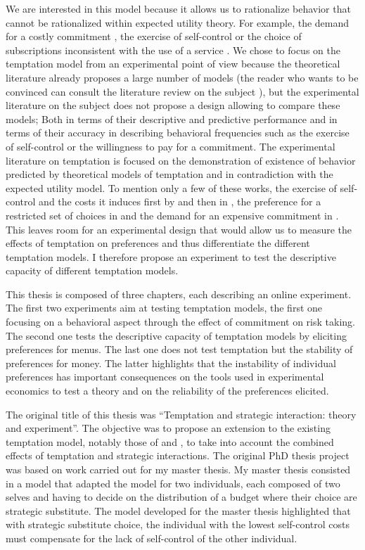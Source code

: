 \documentclass[
]{book}
\begin{document}
We are interested in this model because it allows us to rationalize behavior
that cannot be rationalized within expected utility theory.
For example, the demand for a costly commitment \citep{bryan2010commitment, ashraf2006tying}, the exercise of self-control \citep{dellavigna2004contract} or the choice of subscriptions inconsistent with the use of a service \citep{dellavigna2006paying}.
We chose to focus on the temptation model from an experimental point of view
because the theoretical literature already proposes a large number of models
(the reader who wants to be convinced can consult the literature review on the subject \citet{lipman2013temptation}), but the experimental literature on the subject does not propose a design allowing to compare these models;
Both in terms of their descriptive and predictive performance and in terms of their accuracy in describing behavioral frequencies such as the exercise of self-control or the willingness to pay for a commitment.
The experimental literature on temptation is focused on the demonstration of existence of
behavior predicted by theoretical models of temptation and in contradiction with
the expected utility model.
To mention only a few of these works, the exercise of self-control and the costs
it induces first by \citet{mischel1989delay} and then in \citet{kuhn2014self}, the preference for a
restricted set of choices in \citet{toussaert2018eliciting} and the demand for an expensive
commitment in \citet{houser2018temptation}.
This leaves room for an experimental design that would allow us to measure the
effects of temptation on preferences and thus differentiate the different
temptation models.
I therefore propose an experiment to test the descriptive capacity of different
temptation models.

This thesis is composed of three chapters, each describing an online experiment.
The first two experiments aim at testing temptation models, the first one
focusing on a behavioral aspect through the effect of commitment on risk taking.
The second one tests the descriptive capacity of temptation models by eliciting
preferences for menus.
The last one does not test temptation but the stability of preferences for money.
The latter highlights that the instability of individual preferences has
important consequences on the tools used in experimental economics to test a
theory and on the reliability of the preferences elicited.

The original title of this thesis was ``Temptation and strategic interaction:
theory and experiment''.
The objective was to propose an extension to the existing temptation model,
notably those of \citet{gul2001temptation} and \citet{fudenberg2006dual}, to take into account the combined effects of temptation and strategic interactions.
The original PhD thesis project was based on work carried out for my master thesis.
My master thesis consisted in a model that adapted the \citet{fudenberg2006dual} model for two individuals, each composed of two selves and having to decide on the distribution of a budget where their choice
are strategic substitute.
The model developed for the master thesis highlighted that with strategic substitute choice, the
individual with the lowest self-control costs must compensate for the lack of
self-control of the other individual.
\end{document}
